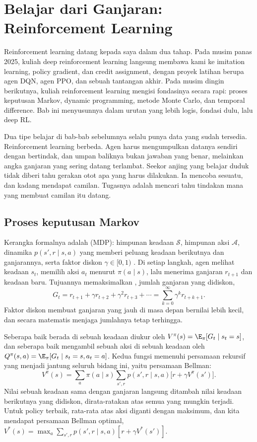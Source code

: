 \chapter{Belajar dari Ganjaran: Reinforcement Learning}
\label{ch:rl}

Reinforcement learning datang kepada saya dalam dua tahap. Pada musim panas 2025, kuliah deep
reinforcement learning langsung membawa kami ke imitation learning, policy gradient, dan credit
assignment, dengan proyek latihan berupa agen DQN, agen PPO, dan sebuah tantangan akhir. Pada
musim dingin berikutnya, kuliah reinforcement learning mengisi fondasinya secara rapi: proses
keputusan Markov, dynamic programming, metode Monte Carlo, dan temporal difference. Bab ini
menyusunnya dalam urutan yang lebih logis, fondasi dulu, lalu deep RL.

Dua tipe belajar di bab-bab sebelumnya selalu punya data yang sudah tersedia. Reinforcement learning
berbeda. Agen harus mengumpulkan datanya sendiri dengan bertindak, dan umpan baliknya bukan jawaban
yang benar, melainkan angka ganjaran yang sering datang terlambat. Seekor anjing yang belajar duduk
tidak diberi tahu gerakan otot apa yang harus dilakukan. Ia mencoba sesuatu, dan kadang mendapat
camilan. Tugasnya adalah mencari tahu tindakan mana yang membuat camilan itu datang.

\section{Proses keputusan Markov}

Kerangka formalnya adalah  (MDP): himpunan keadaan $\mathcal S$,
himpunan aksi $\mathcal A$, dinamika $p(s',r\mid s,a)$ yang memberi peluang keadaan berikutnya dan
ganjarannya, serta faktor diskon $\gamma\in[0,1)$ \citep{sutton2018}. Di setiap langkah, agen melihat
keadaan $s_t$, memilih aksi $a_t$ menurut  $\pi(a\mid s)$, lalu menerima ganjaran
$r_{t+1}$ dan keadaan baru. Tujuannya memaksimalkan , jumlah ganjaran yang didiskon,
\begin{equation}
G_t=r_{t+1}+\gamma r_{t+2}+\gamma^2r_{t+3}+\cdots=\sum_{k=0}^\infty\gamma^kr_{t+k+1}.
\end{equation}
Faktor diskon membuat ganjaran yang jauh di masa depan bernilai lebih kecil, dan secara matematis
menjaga jumlahnya tetap terhingga.

Seberapa baik berada di sebuah keadaan diukur oleh  $V^\pi(s)=\E_\pi[G_t\mid s_t=s]$,
dan seberapa baik mengambil sebuah aksi di sebuah keadaan oleh 
$Q^\pi(s,a)=\E_\pi[G_t\mid s_t=s,a_t=a]$. Kedua fungsi memenuhi persamaan rekursif yang menjadi jantung
seluruh bidang ini, yaitu persamaan Bellman:
\begin{equation}
V^\pi(s)=\sum_a\pi(a\mid s)\sum_{s',r}p(s',r\mid s,a)\big[r+\gamma V^\pi(s')\big].
\end{equation}
Nilai sebuah keadaan sama dengan ganjaran langsung ditambah nilai keadaan berikutnya yang didiskon,
dirata-ratakan atas semua yang mungkin terjadi. Untuk policy terbaik, rata-rata atas aksi diganti
dengan maksimum, dan kita mendapat persamaan Bellman optimal,
$V^*(s)=\max_a\sum_{s',r}p(s',r\mid s,a)[r+\gamma V^*(s')]$.

